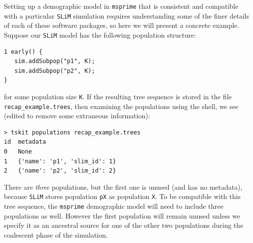 \documentclass[12pt]{article}
\newcommand{\msprime}[0]{\texttt{msprime}\xspace}
\newcommand{\slim}[0]{\texttt{SLiM}\xspace}
\begin{document}
Setting up a demographic model in \msprime that is consistent and compatible with a particular \slim simulation requires
understanding some of the finer details of each of these software packages, so here we will present a concrete example.
Suppose our \slim model has the following population structure:
\begin{lstlisting}[language=slim, style=slimstyle, breaklines=true]
1 early() {
   sim.addSubpop("p1", K);
   sim.addSubpop("p2", K);
}
\end{lstlisting}
for some population size \verb|K|.
If the resulting tree sequence is stored in the file \texttt{recap\_example.trees},
then examining the populations using the shell, we see
(edited to remove some extraneous information):
\begin{verbatim}
> tskit populations recap_example.trees
id	metadata
0	None
1	{'name': 'p1', 'slim_id': 1}
2	{'name': 'p2', 'slim_id': 2}
\end{verbatim}
There are \emph{three} populations, but the first one is unused (and has no metadata),
because \slim stores population \texttt{pX} as population \texttt{X}.
To be compatible with this tree sequence, the \msprime demographic model will need to include three populations as well.
However the first population will remain unused unless we specify it as an ancestral source for
one of the other two populations during the coalescent phase of the simulation.
\end{document}
